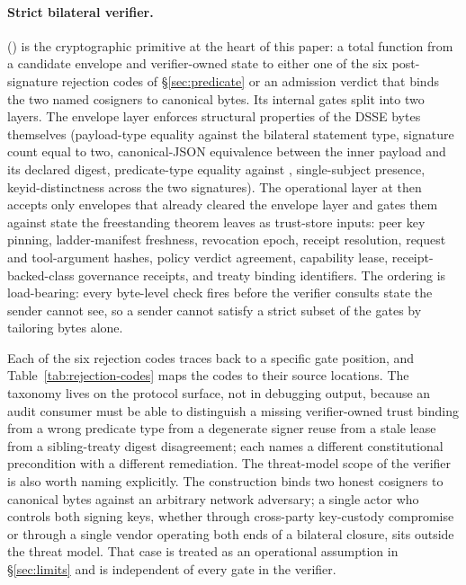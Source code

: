 \paragraph{Strict bilateral verifier.}  () is the cryptographic primitive at the heart of this paper: a total function from a candidate envelope and verifier-owned state to either one of the six post-signature rejection codes of \S\ref{sec:predicate} or an admission verdict that binds the two named cosigners to canonical bytes. Its internal gates split into two layers. The envelope layer enforces structural properties of the DSSE bytes themselves (payload-type equality against the bilateral statement type, signature count equal to two, canonical-JSON equivalence between the inner payload and its declared digest, predicate-type equality against , single-subject presence, keyid-distinctness across the two signatures). The operational layer at  then accepts only envelopes that already cleared the envelope layer and gates them against state the freestanding theorem leaves as trust-store inputs: peer key pinning, ladder-manifest freshness, revocation epoch, receipt resolution, request and tool-argument hashes, policy verdict agreement, capability lease, receipt-backed-class governance receipts, and treaty binding identifiers. The ordering is load-bearing: every byte-level check fires before the verifier consults state the sender cannot see, so a sender cannot satisfy a strict subset of the gates by tailoring bytes alone.

Each of the six rejection codes traces back to a specific gate position, and Table~\ref{tab:rejection-codes} maps the codes to their source locations. The taxonomy lives on the protocol surface, not in debugging output, because an audit consumer must be able to distinguish a missing verifier-owned trust binding from a wrong predicate type from a degenerate signer reuse from a stale lease from a sibling-treaty digest disagreement; each names a different constitutional precondition with a different remediation. The threat-model scope of the verifier is also worth naming explicitly. The construction binds two honest cosigners to canonical bytes against an arbitrary network adversary; a single actor who controls both signing keys, whether through cross-party key-custody compromise or through a single vendor operating both ends of a bilateral closure, sits outside the threat model. That case is treated as an operational assumption in \S\ref{sec:limits} and is independent of every gate in the verifier.

